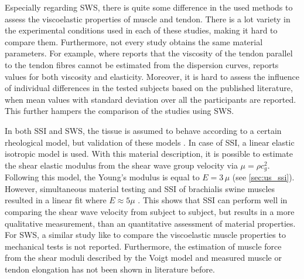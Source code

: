 Especially regarding SWS, there is quite some difference in the used methods to assess the viscoelastic properties of muscle and tendon. There is a lot variety in the experimental conditions used in each of these studies, making it hard to compare them. Furthermore, not every study obtains the same material parameters. For example, where \cite{brum_vivo_2014, helfenstein-didier_vivo_2016} reports that the viscosity of the tendon parallel to the tendon fibres cannot be estimated from the dispersion curves, \cite{cortes_continuous_2015} reports values for both viscosity and elasticity. Moreover, it is hard to assess the influence of individual differences in the tested subjects based on the published literature, when mean values with standard deviation over all the participants are reported. This further hampers the comparison of the studies using SWS.

In both SSI and SWS, the tissue is assumed to behave according to a certain rheological model, but validation of these models . In case of SSI, a linear elastic isotropic model is used. With this material description, it is possible to estimate the shear elastic modulus from the shear wave group velocity via $\mu=\rho c_g^2$. Following this model, the Young's modulus is equal to $E = 3\, \mu$ (see \autoref{sec:us_ssi}). However, simultaneous material testing and SSI of brachialis swine muscles resulted in a linear fit where $E \approx 5\mu$ \cite{eby_validation_2013}. This shows that SSI can perform well in comparing the shear wave velocity from subject to subject, but results in a more qualitative measurement, than an quantitative assessment of material properties. For SWS, a similar study like \cite{eby_validation_2013} to compare the viscoelastic muscle properties to mechanical tests is not reported. Furthermore, the estimation of muscle force from the shear moduli described by the Voigt model and measured muscle or tendon elongation has not been shown in literature before.


